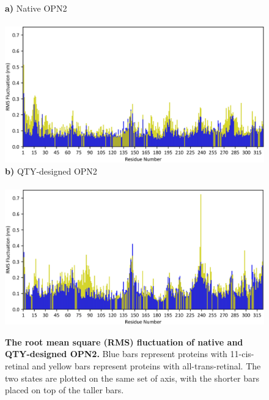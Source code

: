 \documentclass[fleqn,12pt]{supp}
\begin{document}
\begin{figure}[H]
    \caption{\textbf{The root mean square (RMS) fluctuation of native and QTY-designed OPN2. } Blue bars represent proteins with 11-cis-retinal and yellow bars represent proteins with all-trans-retinal. The two states are plotted on the same set of axis, with the shorter bars placed on top of the taller bars. }
    \textbf{a)} Native OPN2 \\ \\
    \includegraphics[width=\linewidth]{FigureS4a.jpg}
    \textbf{b)} QTY-designed OPN2 \\ \\
    \includegraphics[width=\linewidth]{FigureS4b.jpg}
\end{figure}
\end{document}
